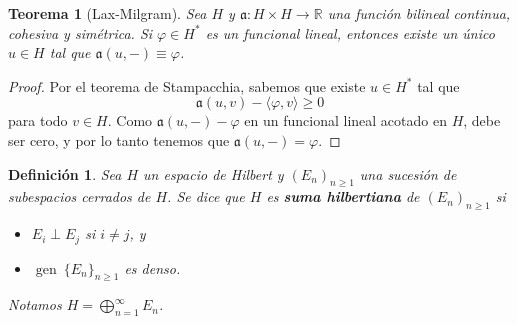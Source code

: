 \documentclass[11pt]{report}
\theoremstyle{colored}
\newtheorem{definition}{Definición}[section]
\newtheorem{theorem}{Teorema}[section]
\newcommand{\R}{\mathbb{R}}
\newcommand{\paint}[1]{\color{color}{#1}}
\begin{document}
\begin{theorem}[Lax-Milgram] Sea $H$ y $\mathfrak{a} : H \times H \to \R$ una función bilineal continua, cohesiva y simétrica. Si $\varphi \in H^*$ es un funcional lineal, entonces existe un único $u \in H$ tal que $\mathfrak{a}(u,-) \equiv \varphi$.
\end{theorem}
\begin{proof} Por el teorema de Stampacchia, sabemos que existe $u \in H^*$ tal que
\[
\mathfrak{a}(u,v) - \langle \varphi, v \rangle \geq 0
\]
para todo $v \in H$. Como $\mathfrak{a}(u,-) - \varphi$ en un funcional lineal acotado en $H$, debe ser cero, y por lo tanto tenemos que $\mathfrak{a}(u,-) = \varphi$.
\end{proof}

\begin{definition} Sea $H$ un espacio de Hilbert y $(E_n)_{n \geq 1}$ una sucesión de subespacios cerrados de $H$. Se dice que $H$ es \textbf{suma hilbertiana} de $(E_n)_{n \geq 1}$ si 
\begin{itemize}
\item[$\paint{\bullet}$] $E_i \perp E_j$ si $i \neq j$, y
\item[$\paint{\bullet}$] $\operatorname{gen} \ \{E_n\}_{n \geq 1}$ es denso.
\end{itemize}
Notamos $H = \bigoplus_{n = 1}^\infty E_n$.
\end{definition}
\end{document}
